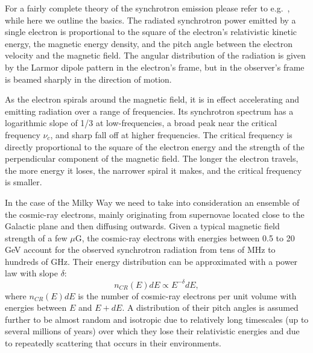 For a fairly complete theory of the synchrotron emission  please refer to e.g.~\cite{pacholczyk70,  rybicki86}, while here we outline the basics. The radiated synchrotron power emitted by a single electron is proportional to the square of the electron's relativistic kinetic energy, the magnetic energy density, and the pitch angle between the electron velocity and the magnetic field.  The angular distribution of the radiation is given by the Larmor dipole pattern in the electron's frame, but in the observer's frame is beamed sharply in the direction of motion. 

As the electron spirals around the magnetic field, it is in effect accelerating and emitting radiation over a range of frequencies. Its synchrotron spectrum has a logarithmic slope of 1/3 at low-frequencies, a broad peak near the critical frequency $\nu_c$, and sharp fall off at higher frequencies. The critical frequency is directly proportional to the square of the electron energy and the strength of the perpendicular component of the magnetic field. The longer the electron travels, the more energy it loses, the narrower spiral it makes, and the critical frequency is smaller. 

In the case of the Milky Way we need to take into consideration an ensemble of the cosmic-ray electrons, mainly originating from supernovae located close to the Galactic plane and then diffusing outwards. Given a typical magnetic field strength of a few $\mu$G, the cosmic-ray electrons with energies between 0.5 to 20 GeV account for the observed synchrotron radiation from tens of MHz to hundreds of GHz. Their energy distribution can be approximated with a power law with slope $\delta$:
\begin{equation}\label{eq:ncr}
n_{CR}(E)dE\propto E^{-\delta}dE,
\end{equation}
where $n_{CR}(E)dE$ is the number of cosmic-ray electrons per unit volume with energies between $E$ and $E+dE$. A distribution of their pitch angles is assumed further to be almost random and isotropic due to relatively long timescales (up to several millions of years) over which they lose their relativistic energies and due to repeatedly scattering that occurs in their environments. 

